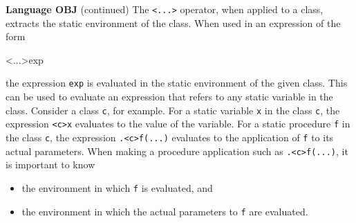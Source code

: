 \begin{minipage}[t]{\sw}
\slidenumber
\LARGE
{\bf Language OBJ} (continued)\exx
The \verb'<...>' operator, when applied to a class,
extracts the static environment of the class.
When used in an expression of the form
\begin{qv}
<...>exp
\end{qv}
the expression \verb'exp' is evaluated
in the static environment of the given class.
This can be used to evaluate an expression
that refers to any static variable in the class.\exx
Consider a class \verb'c', for example.
For a static variable \verb'x' in the class \verb'c',
the expression \verb'<c>x' evaluates
to the value of the variable.
For a static procedure \verb'f' in the class \verb'c',
the expression \verb'.<c>f(...)' evaluates
to the application of \verb'f' to its actual parameters.\exx
When making a procedure application such as \verb'.<c>f(...)',
it is important to know
\begin{itemize}
\parskip -0.5ex
\item the environment in which \verb'f' is evaluated, and
\item the environment in which the actual parameters to \verb'f' are evaluated.
\end{itemize}
\end{minipage}
